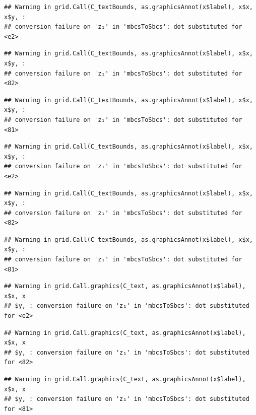 \documentclass[]{article}
\begin{document}
\begin{verbatim}
## Warning in grid.Call(C_textBounds, as.graphicsAnnot(x$label), x$x, x$y, :
## conversion failure on 'z₁' in 'mbcsToSbcs': dot substituted for <e2>
\end{verbatim}

\begin{verbatim}
## Warning in grid.Call(C_textBounds, as.graphicsAnnot(x$label), x$x, x$y, :
## conversion failure on 'z₁' in 'mbcsToSbcs': dot substituted for <82>
\end{verbatim}

\begin{verbatim}
## Warning in grid.Call(C_textBounds, as.graphicsAnnot(x$label), x$x, x$y, :
## conversion failure on 'z₁' in 'mbcsToSbcs': dot substituted for <81>
\end{verbatim}

\begin{verbatim}
## Warning in grid.Call(C_textBounds, as.graphicsAnnot(x$label), x$x, x$y, :
## conversion failure on 'z₁' in 'mbcsToSbcs': dot substituted for <e2>
\end{verbatim}

\begin{verbatim}
## Warning in grid.Call(C_textBounds, as.graphicsAnnot(x$label), x$x, x$y, :
## conversion failure on 'z₁' in 'mbcsToSbcs': dot substituted for <82>
\end{verbatim}

\begin{verbatim}
## Warning in grid.Call(C_textBounds, as.graphicsAnnot(x$label), x$x, x$y, :
## conversion failure on 'z₁' in 'mbcsToSbcs': dot substituted for <81>
\end{verbatim}

\begin{verbatim}
## Warning in grid.Call.graphics(C_text, as.graphicsAnnot(x$label), x$x, x
## $y, : conversion failure on 'z₁' in 'mbcsToSbcs': dot substituted for <e2>
\end{verbatim}

\begin{verbatim}
## Warning in grid.Call.graphics(C_text, as.graphicsAnnot(x$label), x$x, x
## $y, : conversion failure on 'z₁' in 'mbcsToSbcs': dot substituted for <82>
\end{verbatim}

\begin{verbatim}
## Warning in grid.Call.graphics(C_text, as.graphicsAnnot(x$label), x$x, x
## $y, : conversion failure on 'z₁' in 'mbcsToSbcs': dot substituted for <81>
\end{verbatim}
\end{document}

